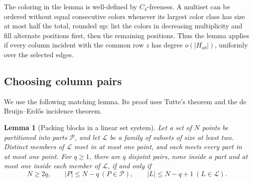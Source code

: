\documentclass[11pt,a4paper]{article}
\newtheorem{lemma}[theorem]{Lemma}
\theoremstyle{definition}
\begin{document}
The coloring in the lemma is well-defined by $C_4$-freeness. A multiset
can be ordered without equal consecutive colors whenever its largest
color class has size at most half the total, rounded up: list the colors
in decreasing multiplicity and fill alternate positions first, then the
remaining positions. Thus the lemma
applies if every column incident with the common row $z$ has degree
$o(|H_{ab}|)$, uniformly over the selected edges.

\subsection{Choosing column pairs}

We use the following matching lemma.
Its proof uses Tutte's theorem and the de Bruijn--Erd\H{o}s incidence theorem.
\begin{lemma}[Packing blocks in a linear set system]\label{lem:block-capacity}
Let a set of $N$ points be partitioned into parts $\mathcal P$, and let
$\mathcal L$ be a family of subsets of size at least two. Distinct members
of $\mathcal L$ meet in at most one point, and each meets every part in
at most one point. For $q\ge1$, there are $q$ disjoint pairs, none inside a part and
at most one inside each member of $\mathcal L$, if and only if
\[
 N\ge2q,\qquad |P|\le N-q\ (P\in\mathcal P),\qquad
 |L|\le N-q+1\ (L\in\mathcal L).
\]
\end{lemma}
\end{document}
